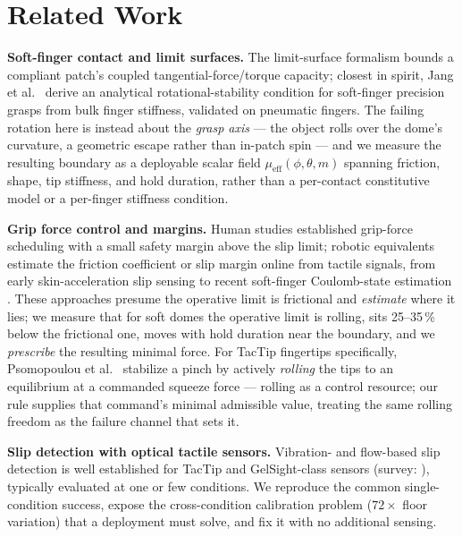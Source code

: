 \documentclass[journal]{IEEEtran}
\newcommand{\mueff}{\mu_{\mathrm{eff}}}
\begin{document}
\section{Related Work}

\textbf{Soft-finger contact and limit surfaces.} The limit-surface
formalism \cite{goyal1991planar,kao1992quasistatic,xydas1999modeling}
bounds a compliant patch's coupled tangential-force/torque capacity;
closest in spirit, Jang et al.\ \cite{jang2024rotational} derive an
analytical rotational-stability condition for soft-finger precision grasps
from bulk finger stiffness, validated on pneumatic fingers. The failing
rotation here is instead about the \emph{grasp axis} --- the object rolls
over the dome's curvature, a geometric escape rather than in-patch spin ---
and we measure the resulting boundary as a deployable scalar field
$\mueff(\phi,\theta,m)$ spanning friction, shape, tip stiffness, and hold
duration, rather than a per-contact constitutive model or a per-finger
stiffness condition.

\textbf{Grip force control and margins.} Human studies
\cite{johansson1984roles} established grip-force scheduling with a small
safety margin above the slip limit; robotic equivalents estimate the
friction coefficient or slip margin online from tactile signals, from early
skin-acceleration slip sensing \cite{howe1989sensing} to recent soft-finger
Coulomb-state estimation \cite{jang2024soft}. These approaches presume the
operative limit is frictional and \emph{estimate} where it lies; we measure
that for soft domes the operative limit is rolling, sits 25--35\,\% below
the frictional one, moves with hold duration near the boundary, and we
\emph{prescribe} the resulting minimal force. For TacTip fingertips
specifically, Psomopoulou et al.\ \cite{psomopoulou2021pinching} stabilize
a pinch by actively \emph{rolling} the tips to an equilibrium at a
commanded squeeze force --- rolling as a control resource; our rule
supplies that command's minimal admissible value, treating the same rolling
freedom as the failure channel that sets it.

\textbf{Slip detection with optical tactile sensors.} Vibration- and
flow-based slip detection is well established for TacTip
\cite{chorley2009development,wardcherrier2018tactip,james2018slip} and
GelSight-class sensors \cite{johnson2009retrographic,yuan2017gelsight}
(survey: \cite{kappassov2015tactile}), typically evaluated at one or few
conditions. We reproduce the common single-condition success, expose the
cross-condition calibration problem ($72\times$ floor variation) that a
deployment must solve, and fix it with no additional sensing.
\end{document}
